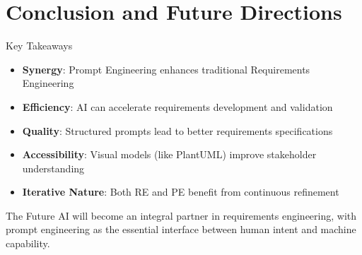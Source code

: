 \documentclass{beamer}
\begin{document}
\section{Conclusion and Future Directions}

\begin{frame}{Key Takeaways}
    \begin{itemize}
        \item \textbf{Synergy}: Prompt Engineering enhances traditional Requirements Engineering
        \item \textbf{Efficiency}: AI can accelerate requirements development and validation
        \item \textbf{Quality}: Structured prompts lead to better requirements specifications
        \item \textbf{Accessibility}: Visual models (like PlantUML) improve stakeholder understanding
        \item \textbf{Iterative Nature}: Both RE and PE benefit from continuous refinement
    \end{itemize}
    
    \begin{block}{The Future}
        AI will become an integral partner in requirements engineering, with prompt engineering as the essential interface between human intent and machine capability.
    \end{block}
\end{frame}

\end{document}
